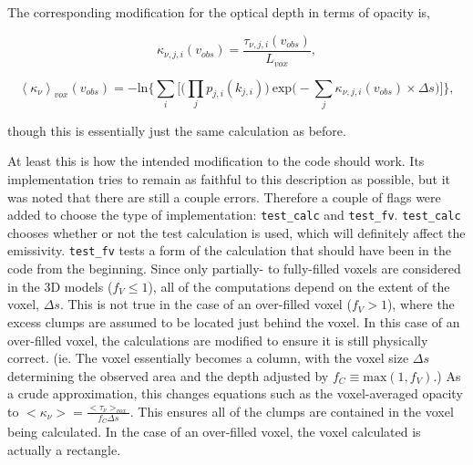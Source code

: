 \documentclass[a4paper]{article}
\begin{document}
    The corresponding modification for the optical depth in terms of opacity is,

    \begin{equation}
    \label{corrected opacity}
    \kappa_{\nu,j,i} (v_{obs}) = \frac{\tau_{\nu,j,i} (v_{obs})}{L_{vox}},
    \end{equation}

    \begin{equation}
    \label{corrected voxel-averaged opacity}
    \left< \kappa_\nu \right>_{vox} (v_{obs}) = -\mathrm{ln} \Bigg\{ \sum_i \bigg[ \Big( \prod_j p_{j,i}(k_{j,i}) \Big) \ \mathrm{exp} \Big( - \sum_j \kappa_{\nu,j,i} (v_{obs}) \times \Delta s \Big) \bigg] \Bigg\},
    \end{equation}

    though this is essentially just the same calculation as before.

    At least this is how the intended modification to the code should work.
    Its implementation tries to remain as faithful to this description as possible, but it was noted that there are still a couple errors.
    Therefore a couple of flags were added to choose the type of implementation: \texttt{test\_calc} and \texttt{test\_fv}.
    \texttt{test\_calc} chooses whether or not the test calculation is used, which will definitely affect the emissivity.
    \texttt{test\_fv} tests a form of the calculation that should have been in the code from the beginning.
    Since only partially- to fully-filled voxels are considered in the 3D models (\(f_V \leq 1\)), all of the computations depend on the extent of the voxel, \(\Delta s\).
    This is not true in the case of an over-filled voxel (\(f_V > 1\)), where the excess clumps are assumed to be located just behind the voxel.
    In this case of an over-filled voxel, the calculations are modified to ensure it is still physically correct.
    (ie. The voxel essentially becomes a column, with the voxel size \(\Delta s\) determining the observed area and the depth adjusted by \(f_C \equiv \mathrm{max}(1, f_V)\).)
    As a crude approximation, this changes equations such as the voxel-averaged opacity to \(<\kappa_\nu> = \frac{<\tau_\nu>_{vox}}{f_C \Delta s}\).
    This ensures all of the clumps are contained in the voxel being calculated.
    In the case of an over-filled voxel, the voxel calculated is actually a rectangle.
\end{document}
